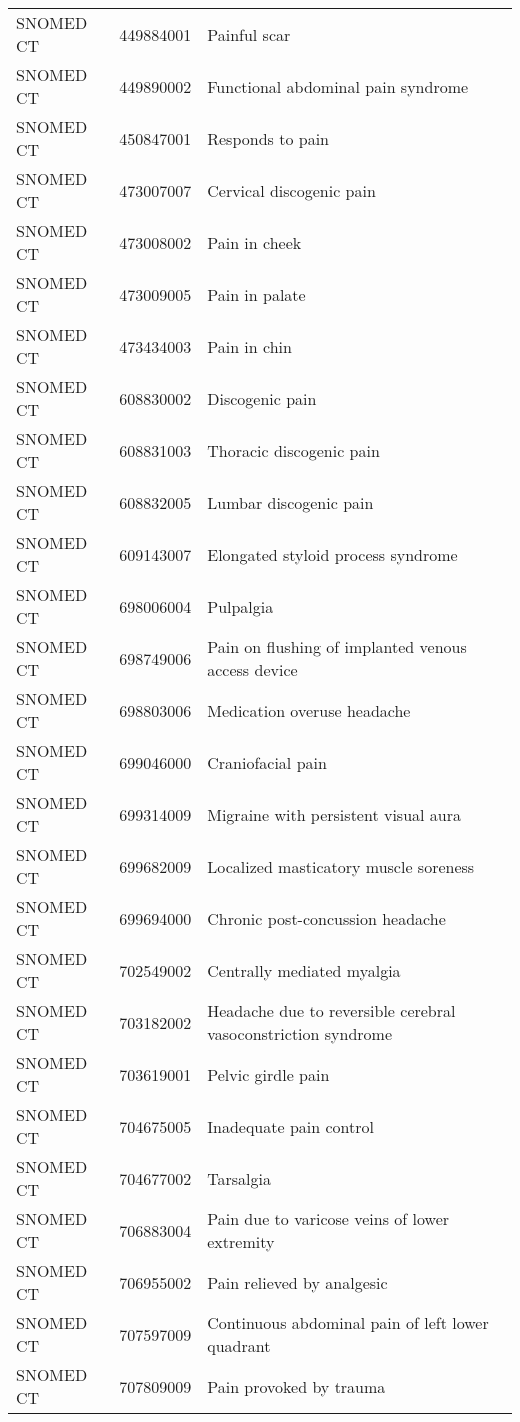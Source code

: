 \begin{longtable}{p{}p{}p{}}
  SNOMED CT & 449884001 & Painful scar \\ 
  SNOMED CT & 449890002 & Functional abdominal pain syndrome \\ 
  SNOMED CT & 450847001 & Responds to pain \\ 
  SNOMED CT & 473007007 & Cervical discogenic pain \\ 
  SNOMED CT & 473008002 & Pain in cheek \\ 
  SNOMED CT & 473009005 & Pain in palate \\ 
  SNOMED CT & 473434003 & Pain in chin \\ 
  SNOMED CT & 608830002 & Discogenic pain \\ 
  SNOMED CT & 608831003 & Thoracic discogenic pain \\ 
  SNOMED CT & 608832005 & Lumbar discogenic pain \\ 
  SNOMED CT & 609143007 & Elongated styloid process syndrome \\ 
  SNOMED CT & 698006004 & Pulpalgia \\ 
  SNOMED CT & 698749006 & Pain on flushing of implanted venous access device \\ 
  SNOMED CT & 698803006 & Medication overuse headache \\ 
  SNOMED CT & 699046000 & Craniofacial pain \\ 
  SNOMED CT & 699314009 & Migraine with persistent visual aura \\ 
  SNOMED CT & 699682009 & Localized masticatory muscle soreness \\ 
  SNOMED CT & 699694000 & Chronic post-concussion headache \\ 
  SNOMED CT & 702549002 & Centrally mediated myalgia \\ 
  SNOMED CT & 703182002 & Headache due to reversible cerebral vasoconstriction syndrome \\ 
  SNOMED CT & 703619001 & Pelvic girdle pain \\ 
  SNOMED CT & 704675005 & Inadequate pain control \\ 
  SNOMED CT & 704677002 & Tarsalgia \\ 
  SNOMED CT & 706883004 & Pain due to varicose veins of lower extremity \\ 
  SNOMED CT & 706955002 & Pain relieved by analgesic \\ 
  SNOMED CT & 707597009 & Continuous abdominal pain of left lower quadrant \\ 
  SNOMED CT & 707809009 & Pain provoked by trauma \\ 

\end{longtable}

